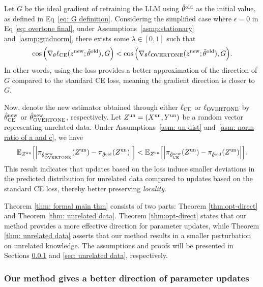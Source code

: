 \begin{theorem}[Formal]
\label{thm: formal main thm}
    Let $G$ be the ideal gradient of retraining the LLM using $\hat{\theta}^{\text{old}}$ as the initial value, as defined in Eq~\eqref{eq: G definition}.
    Considering the simplified case where $\epsilon = 0$ in Eq \eqref{eq: overtone final}, under Assumptions~\ref{asmp:stationary} and~\ref{asmp:gradnorm}, 
    there exists some $\lambda \in [0,1]$ such that
    \begin{equation*}
        \cos \qty( \nabla_\theta \ell_{\text{CE}} (z^{\text{new}}; \hat{\theta}^{\text{old}}), G ) < \cos \qty( \nabla_\theta \ell_{\text{OVERTONE}} (z^{\text{new}}; \hat{\theta}^{\text{old}}), G ).
    \end{equation*}
    In other words, using the {\NAME} loss provides a better approximation of the direction of $G$ compared to the standard CE loss, meaning the gradient direction is closer to $G$.

    Now, denote the new estimator obtained through either $\ell_{\text{CE}}$ or $\ell_{\text{OVERTONE}}$ by $\hat{\theta}^{\text{new}}_{\text{CE}}$ or $\hat{\theta}^{\text{new}}_{\text{OVERTONE}}$, respectively. Let $ Z^{\text{un}} = (X^{\text{un}}, Y^{\text{un}}) $ be a random vector representing unrelated data. Under Assumptions~\ref{asm: un-dist} and~\ref{asm: norm ratio of a and c}, we have
    \begin{equation*}
        \mathbb{E}_{Z^{\text{un}}} \qty[\qty| \pi_{\hat{\theta}^{\text{new}}_{\text{OVERTONE}}} (Z^{\text{un}}) 
        - \pi_{\hat{\theta}^{\text{old}}} (Z^{\text{un}}) | ] < \mathbb{E}_{Z^{\text{un}}} \qty[\qty| \pi_{\hat{\theta}^{\text{new}}_{\text{CE}}} (Z^{\text{un}}) 
        - \pi_{\hat{\theta}^{\text{old}}} (Z^{\text{un}})| ].
        \end{equation*}
    This result indicates that updates based on the {\NAME} loss induce smaller deviations in the predicted distribution for unrelated data compared to updates based on the standard CE loss, thereby better preserving \textit{locality}.
\end{theorem}

Theorem \ref{thm: formal main thm} consists of two parts: Theorem \ref{thm:opt-direct} and Theorem \ref{thm: unrelated data}. Theorem \ref{thm:opt-direct} states that our method provides a more effective direction for parameter updates, while Theorem \ref{thm: unrelated data} asserts that our method results in a smaller perturbation on unrelated knowledge. The assumptions and proofs will be presented in Sections \ref{sec: related data} and \ref{sec: unrelated data}, respectively.

\subsubsection{Our method gives a better direction of parameter updates}
\label{sec: related data}


